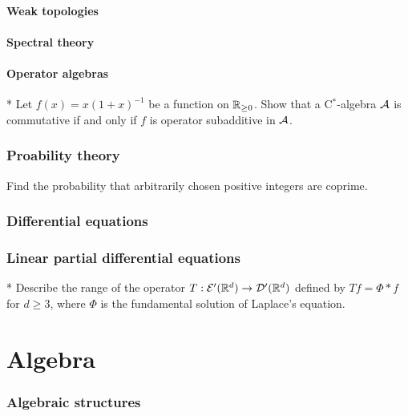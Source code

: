\documentclass[12pt]{article}
\begin{document}
	\subsection{Weak topologies}
	\subsection{Spectral theory}
	\subsection{Operator algebras}
	\begin{prb}*
	Let $f(x)=x(1+x)^{-1}$ be a function on $\mathbb{R}_{\ge0}$.
	Show that a C$^*$-algebra $\mathcal{A}$ is commutative if and only if $f$ is operator subadditive in $\mathcal{A}$.
	\end{prb}

\section{Proability theory}

	\begin{prb}
	Find the probability that arbitrarily chosen positive integers are coprime.
	\end{prb}


\section{Differential equations}

\section{Linear partial differential equations}


	\begin{prb}*
	Describe the range of the operator $T:\mathcal{E}'(\mathbb{R}^d)\to\mathcal{D}'(\mathbb{R}^d)$ defined by $Tf=\Phi*f$ for $d\ge3$, where $\Phi$ is the fundamental solution of Laplace's equation.
	\end{prb}









\newpage
\part{Algebra}
\setcounter{section}{0}

\section{Algebraic structures}
\end{document}
